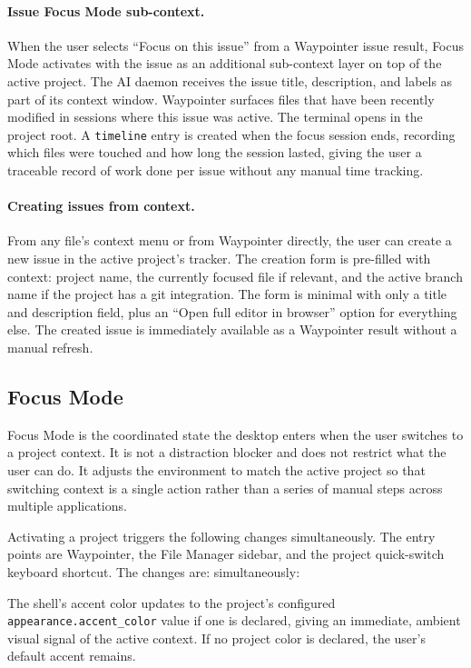 \paragraph{Issue Focus Mode sub-context.}
When the user selects ``Focus on this issue'' from a Waypointer issue result,
Focus Mode activates with the issue as an additional sub-context layer on top
of the active project. The AI daemon receives the issue title, description,
and labels as part of its context window. Waypointer surfaces files that have
been recently modified in sessions where this issue was active. The terminal
opens in the project root. A \texttt{timeline} entry is created when the focus
session ends, recording which files were touched and how long the session
lasted, giving the user a traceable record of work done per issue without
any manual time tracking.

\paragraph{Creating issues from context.}
From any file's context menu or from Waypointer directly, the user can create
a new issue in the active project's tracker. The creation form is pre-filled
with context: project name, the currently focused file if relevant, and the
active branch name if the project has a git integration. The form is minimal
with only a title and description field, plus an ``Open full editor in browser'' option
for everything else. The created issue is immediately available as a Waypointer
result without a manual refresh.

\subsection{Focus Mode}
\label{sec:focus-mode}

Focus Mode is the coordinated state the desktop enters when the user switches
to a project context. It is not a distraction blocker and does not restrict
what the user can do. It adjusts the environment to match the active project
so that switching context is a single action rather than a series of manual
steps across multiple applications.

Activating a project triggers the following changes simultaneously. The entry
points are Waypointer, the File Manager sidebar, and the project quick-switch
keyboard shortcut. The changes are:
simultaneously:

The shell's accent color updates to the project's configured
\texttt{appearance.accent\_color} value if one is declared, giving an
immediate, ambient visual signal of the active context. If no project color
is declared, the user's default accent remains.

